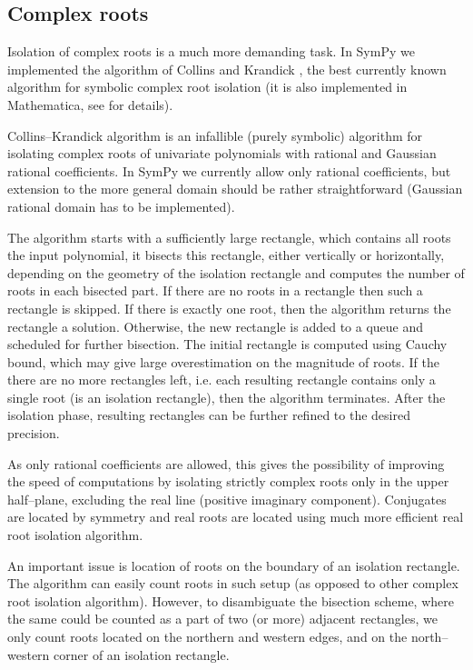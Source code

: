 \subsection{Complex roots}

Isolation of complex roots is a much more demanding task. In SymPy we implemented the algorithm
of Collins and Krandick \cite{Collins1992infallible}, the best currently known algorithm for symbolic
complex root isolation (it is also implemented in Mathematica, see \cite{MathematicaInternal} for
details).

Collins--Krandick algorithm is an infallible (purely symbolic) algorithm for isolating complex
roots of univariate polynomials with rational and Gaussian rational coefficients. In SymPy we
currently allow only rational coefficients, but extension to the more general domain should be
rather straightforward (Gaussian rational domain has to be implemented).

The algorithm starts with a sufficiently large rectangle, which contains all roots the input
polynomial, it bisects this rectangle, either vertically or horizontally, depending on the
geometry of the isolation rectangle and computes the number of roots in each bisected part.
If there are no roots in a rectangle then such a rectangle is skipped. If there is exactly
one root, then the algorithm returns the rectangle a solution. Otherwise, the new rectangle
is added to a queue and scheduled for further bisection. The initial rectangle is computed
using Cauchy bound, which may give large overestimation on the magnitude of roots. If the
there are no more rectangles left, i.e. each resulting rectangle contains only a single
root (is an isolation rectangle), then the algorithm terminates. After the isolation phase,
resulting rectangles can be further refined to the desired precision.

As only rational coefficients are allowed, this gives the possibility of improving the speed
of computations by isolating strictly complex roots only in the upper half--plane, excluding
the real line (positive imaginary component). Conjugates are located by symmetry and real
roots are located using much more efficient real root isolation algorithm.

An important issue is location of roots on the boundary of an isolation rectangle. The
algorithm can easily count roots in such setup (as opposed to other complex root isolation
algorithm). However, to disambiguate the bisection scheme, where the same could be counted
as a part of two (or more) adjacent rectangles, we only count roots located on the northern
and western edges, and on the north--western corner of an isolation rectangle.

